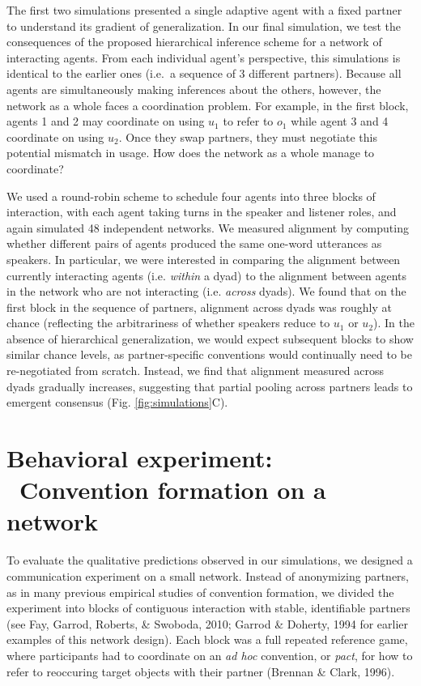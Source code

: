 \documentclass[10pt, letterpaper]{article}
\begin{document}
The first two simulations presented a single adaptive agent with a fixed
partner to understand its gradient of generalization. In our final
simulation, we test the consequences of the proposed hierarchical
inference scheme for a network of interacting agents. From each
individual agent's perspective, this simulations is identical to the
earlier ones (i.e.~a sequence of 3 different partners). Because all
agents are simultaneously making inferences about the others, however,
the network as a whole faces a coordination problem. For example, in the
first block, agents 1 and 2 may coordinate on using \(u_1\) to refer to
\(o_1\) while agent 3 and 4 coordinate on using \(u_2\). Once they swap
partners, they must negotiate this potential mismatch in usage. How does
the network as a whole manage to coordinate?

We used a round-robin scheme to schedule four agents into three blocks
of interaction, with each agent taking turns in the speaker and listener
roles, and again simulated 48 independent networks. We measured
alignment by computing whether different pairs of agents produced the
same one-word utterances as speakers. In particular, we were interested
in comparing the alignment between currently interacting agents (i.e.
\emph{within} a dyad) to the alignment between agents in the network who
are not interacting (i.e. \emph{across} dyads). We found that on the
first block in the sequence of partners, alignment across dyads was
roughly at chance (reflecting the arbitrariness of whether speakers
reduce to \(u_1\) or \(u_2\)). In the absence of hierarchical
generalization, we would expect subsequent blocks to show similar chance
levels, as partner-specific conventions would continually need to be
re-negotiated from scratch. Instead, we find that alignment measured
across dyads gradually increases, suggesting that partial pooling across
partners leads to emergent consensus (Fig. \ref{fig:simulations}C).

\hypertarget{behavioral-experiment-convention-formation-on-a-network}{%
\section{Behavioral experiment: ~Convention formation on a
network}\label{behavioral-experiment-convention-formation-on-a-network}}

To evaluate the qualitative predictions observed in our simulations, we
designed a communication experiment on a small network. Instead of
anonymizing partners, as in many previous empirical studies of
convention formation, we divided the experiment into blocks of
contiguous interaction with stable, identifiable partners (see Fay,
Garrod, Roberts, \& Swoboda, 2010; Garrod \& Doherty, 1994 for earlier
examples of this network design). Each block was a full repeated
reference game, where participants had to coordinate on an \emph{ad hoc}
convention, or \emph{pact}, for how to refer to reoccuring target
objects with their partner (Brennan \& Clark, 1996).
\end{document}
